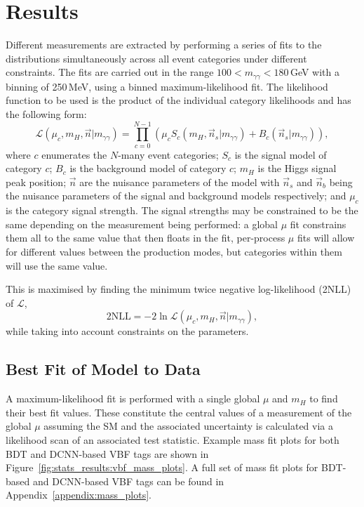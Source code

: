 \section{Results}
Different measurements are extracted by performing a series of fits to the \mgg distributions simultaneously across all event categories under different constraints. 
The fits are carried out in the range $100 < m_{\gamma\gamma} < 180$\,GeV with a binning of 250\,MeV, using a binned maximum-likelihood fit.
The likelihood function to be used is the product of the individual category likelihoods and has the following form:
\begin{equation}
    \mathcal{L}(\mu_{c},m_H,\vec{n}|m_{\gamma\gamma}) = \prod_{c=0}^{N-1} \left( \mu_{c} S_{c}( m_{H}, \vec{n}_{s} | m_{\gamma\gamma}) + B_{c}( \vec{n}_{s} | m_{\gamma\gamma}) \right),
\end{equation}
where $c$ enumerates the $N$-many event categories; $S_{c}$ is the signal model of category $c$; $B_{c}$ is the background model of category $c$; $m_H$ is the Higgs signal peak position; $\vec{n}$ are the nuisance parameters of the model with $\vec{n}_s$ and $\vec{n}_b$ being the nuisance parameters of the signal and background models respectively; and $\mu_{c}$ is the category signal strength. 
The signal strengths may be constrained to be the same depending on the measurement being performed: a global $\mu$ fit constrains them all to the same value that then floats in the fit, per-process $\mu$ fits will allow for different values between the production modes, but categories within them will use the same value. 

This is maximised by finding the minimum twice negative log-likelihood (2NLL) of $\mathcal{L}$, 
\begin{equation}
    2\mathrm{NLL} = -2\ln\mathcal{L}(\mu_{c},m_H,\vec{n}|m_{\gamma\gamma}),
\end{equation}
while taking into account constraints on the parameters. 


\subsection{Best Fit of Model to Data}
A maximum-likelihood fit is performed with a single global $\mu$ and $m_H$ to find their best fit values.
These constitute the central values of a measurement of the global $\mu$ assuming the SM and the associated uncertainty is calculated via a likelihood scan of an associated test statistic. 
Example mass fit plots for both BDT and DCNN-based VBF tags are shown in Figure~\ref{fig:stats_results:vbf_mass_plots}.
A full set of mass fit plots for BDT-based and DCNN-based VBF tags can be found in Appendix~\ref{appendix:mass_plots}.

